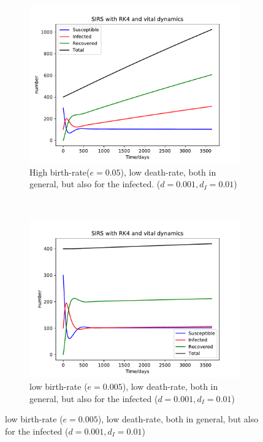 \begin{figure}[H]
    \centering
    \begin{subfigure}{0.49\textwidth}
        \centering
        \includegraphics[width=\linewidth]{../fig/newfig/RK4_vitalDynamics_d001_dI01_e05.pdf}
        \caption{High birth-rate($e=0.05$), low death-rate, both in general, but also for the infected. ($d = 0.001, d_I =0.01$)}
    \end{subfigure}%
     ~ 
    \begin{subfigure}{0.49\textwidth}
         \centering
         \includegraphics[width=\linewidth]{../fig/newfig/RK4_vitalDynamics_d001_dI01_e005.pdf}
         \caption{low birth-rate ($e = 0.005$), low death-rate, both in general, but also for the infected ($d = 0.001, d_I =0.01$)}

\end{subfigure}
\end{figure}

